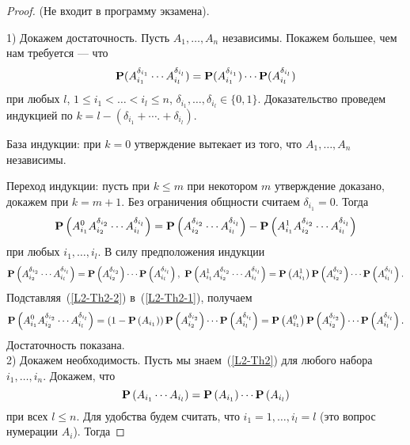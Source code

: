 \documentclass[11 pt,russian]{article}
\begin{document}
\begin{proof}(Не входит в программу экзамена).

1) Докажем достаточность. Пусть $A_1,\dotsc,A_n$ независимы. Покажем большее, чем нам требуется --- что
$$
{\bf P}(A_{i_1}^{\delta_{i_1}} \dotsm A_{i_l}^{\delta_{i_l}}) = {\bf P}(A_{i_1}^{\delta_{i_1}}) \dotsm {\bf P}(A_{i_l}^{\delta_{i_l}})
$$ 
при любых $l$, $1\le i_1 < \dotsc < i_l\le n$, $\delta_{i_1},\dotsc,\delta_{i_l}\in \{0,1\}$. 
Доказательство проведем индукцией по $k=l-(\delta_{i_1}+\dotsb.+\delta_{i_l})$.

База индукции: при $k=0$ утверждение вытекает из того, что $A_1,\dotsc,A_n$ независимы.

Переход индукции: пусть при $k\le m$ при некотором $m$ утверждение доказано, докажем при $k=m+1$. Без ограничения общности считаем $\delta_{i_1} = 0$. Тогда
\begin{equation}
\label{L2-Th2-1}
{\bf P}\left(A_{i_1}^{0} A_{i_2}^{\delta_{i_2}} \dotsm A_{i_l}^{\delta_{i_l}}\right) = {\bf P}\left(A_{i_2}^{\delta_{i_2}} \dotsm A_{i_l}^{\delta_{i_l}}\right) - {\bf P}\left(A_{i_1}^{1} A_{i_2}^{\delta_{i_2}} \dotsm A_{i_l}^{\delta_{i_l}}\right) 
\end{equation}
при любых $i_1,\dotsc,i_l$. В силу предположения индукции
\begin{equation}
\label{L2-Th2-2}
{\bf P}\left(A_{i_2}^{\delta_{i_2}} \dotsm A_{i_l}^{\delta_{i_l}}\right) = {\bf P}\left(A_{i_2}^{\delta_{i_2}}\right) \dotsm {\bf P}\left(A_{i_l}^{\delta_{i_l}}\right),\
{\bf P}\left(A_{i_1}^{1} A_{i_2}^{\delta_{i_2}} \dotsm A_{i_l}^{\delta_{i_l}}\right) = {\bf P}\left(A_{i_1}^{1}\right) {\bf P}\left(A_{i_2}^{\delta_{i_2}}\right) \dotsm {\bf P}\left(A_{i_l}^{\delta_{i_l}}\right).
\end{equation}
Подставляя~(\ref{L2-Th2-2}) в~(\ref{L2-Th2-1}), получаем
$$
{\bf P}\left(A_{i_1}^{0} A_{i_2}^{\delta_{i_2}} \dotsm A_{i_l}^{\delta_{i_l}}\right) = \left(1 - {\bf P}\left(A_{i_1}\right)\right) {\bf P}\left(A_{i_2}^{\delta_{i_2}}\right) \dotsm {\bf P}\left(A_{i_l}^{\delta_{i_l}}\right) =
{\bf P}\left(A_{i_1}^0\right) {\bf P}\left(A_{i_2}^{\delta_{i_2}}\right) \dotsm {\bf P}\left(A_{i_l}^{\delta_{i_l}}\right).
$$
Достаточность показана.\\
2) Докажем необходимость. Пусть мы знаем~(\ref{L2-Th2}) для любого набора $i_1,\dotsc, i_n$. Докажем, что 
$$
{\bf P}\left(A_{i_1} \dotsm A_{i_l}\right) = {\bf P}\left(A_{i_1}\right) \dotsm {\bf P}\left(A_{i_l}\right)
$$
при всех $l\le n$. Для удобства будем считать, что $i_1=1,\dotsc,i_l=l$ (это вопрос нумерации $A_i$). Тогда

\end{proof}
\end{document}
